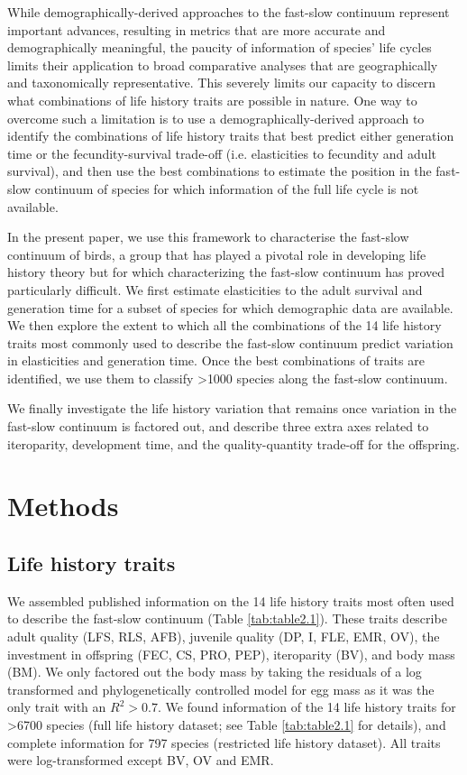 While demographically-derived approaches to the fast-slow continuum represent
important advances, resulting in metrics that are more accurate and
demographically meaningful, the paucity of information of species’ life cycles
limits their application to broad comparative analyses that are geographically
and taxonomically representative. This severely limits our capacity to discern
what combinations of life history traits are possible in nature. One way to
overcome such a limitation is to use a demographically-derived approach to
identify the combinations of life history traits that best predict either
generation time or the fecundity-survival trade-off (i.e. elasticities to
fecundity and adult survival), and then use the best combinations to estimate
the position in the fast-slow continuum of species for which information of the
full life cycle is not available.

In the present paper, we use this framework to characterise the fast-slow
continuum of birds, a group that has played a pivotal role in developing life
history theory but for which characterizing the fast-slow continuum has proved
particularly difficult. We first estimate elasticities to the adult survival and
generation time for a subset of species for which demographic data are
available. We then explore the extent to which all the combinations of the 14
life history traits most commonly used to describe the fast-slow continuum 
predict variation in elasticities and generation time. Once the best 
combinations of traits are identified, we use them to classify 
\textgreater{1000} species along the fast-slow continuum.

We finally investigate the life history variation that remains once variation
in the fast-slow continuum is factored out, and describe three extra axes
related to iteroparity, development time, and the quality-quantity trade-off for
the offspring.


\section{Methods}

\subsection*{Life history traits}

We assembled published information on the 14 life history traits most often used
to describe the fast-slow continuum (Table \ref{tab:table2.1}). These traits
describe adult quality (LFS, RLS, AFB), juvenile quality (DP, I, FLE, EMR,
OV), the investment in offspring (FEC, CS, PRO, PEP), iteroparity (BV), and body
mass (BM). We only factored out the body mass by taking the residuals of a log
transformed and phylogenetically controlled model for egg mass as it was the
only trait with an $R^2 > 0.7$. We found information of the 14 life history
traits for \textgreater{6700} species (full life history dataset; see Table
\ref{tab:table2.1} for details), and complete information for 797 species
(restricted life history dataset). All traits were log-transformed except BV, OV
and EMR.


